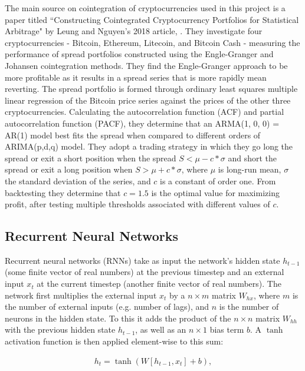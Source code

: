 \documentclass{article}
\begin{document}
The main source on cointegration of cryptocurrencies used in this project is a paper titled ``Constructing Cointegrated Cryptocurrency Portfolios for Statistical Arbitrage" by Leung and Nguyen's 2018 article, \cite{leung2018constructing}. They investigate four cryptocurrencies - Bitcoin, Ethereum, Litecoin, and Bitcoin Cash - measuring the performance of spread portfolios constructed using the Engle-Granger and Johansen cointegration methods. They find the Engle-Granger approach to be more profitable as it results in a spread series that is more rapidly mean reverting. The spread portfolio is formed through ordinary least squares multiple linear regression of the Bitcoin price series against the prices of the other three cryptocurrencies. Calculating the autocorrelation function (ACF) and partial autocorrelation function (PACF), they determine that an ARMA(1, 0, 0) = AR(1) model best fits the spread when compared to different orders of ARIMA(p,d,q) model. They adopt a trading strategy in which they go long the spread or exit a short position when the spread $S < \mu -  c * \sigma$ and short the spread or exit a long position when $S > \mu +  c * \sigma$, where $\mu$ is long-run mean, $\sigma$ the standard deviation of the series, and $c$ is a constant of order one. From backtesting they determine that $c = 1.5$ is the optimal value for maximizing profit, after testing multiple thresholds associated with different values of $c$. 


\subsection{Recurrent Neural Networks}

Recurrent neural networks (RNNs) take as input the network's hidden state $h_{t-1}$ (some finite vector of real numbers) at the previous timestep and an external input $x_{t}$ at the current timestep (another finite vector of real numbers). The network first multiplies the external input  $x_{t}$ by a $n \times m$ matrix $W_{hx}$, where $m$ is the number of external inputs (e.g. number of lags), and $n$ is the number of neurons in the hidden state. To this it adds the product of the $n \times n$ matrix $W_{hh}$ with the previous hidden state $h_{t-1}$, as well as an $n \times 1$ bias term $b$. A $\tanh$ activation function is then applied element-wise to this sum: 

\begin{align}
h_{t} = \tanh(W [h_{t-1}, x_{t}] + b),
\end{align} 
\end{document}
